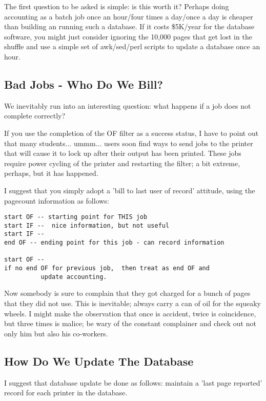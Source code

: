 \documentclass[a4paper]{article}
\begin{document}
The first question to be asked is simple:  is this worth it?
Perhaps doing accounting as a batch job once an hour/four times
a day/once a day is cheaper than building an running such a database.
If it costs \$5K/year for the database software, you might just consider
ignoring the 10,000 pages that get lost in the shuffle and use
a simple set of awk/sed/perl scripts to update a database once
an hour.


\subsection{Bad Jobs - Who Do We Bill?}

We inevitably run into an interesting question:
what happens if a job does not complete correctly?

If you use the completion of the OF filter as a success status, I have
to point out that many students... ummm... users soon find ways to send
jobs to the printer that will cause it to lock up after their output
has been printed. These jobs require power cycling of the printer and
restarting the filter; a bit extreme, perhaps, but it has happened.

I suggest that you simply adopt a 'bill to last user of record'
attitude,  using the pagecount information as follows:
\begin{tscreen}
\begin{verbatim}
start OF -- starting point for THIS job
start IF --  nice information, but not useful
start IF --
end OF -- ending point for this job - can record information

start OF --
if no end OF for previous job,  then treat as end OF and
          update accounting.
\end{verbatim}
\end{tscreen}


Now somebody is sure to complain that they got charged for a bunch of
pages that they did not use.  This is inevitable;  always carry a
can of oil for the squeaky wheels.  I might make the observation that
once is accident, twice is coincidence, but three times is malice;
be wary of the constant complainer and check out not only him but
also his co-workers.


\subsection{How Do We Update The Database}

I suggest that database update be done as follows:
maintain a 'last page reported' record for each printer in the
database.
\end{document}
